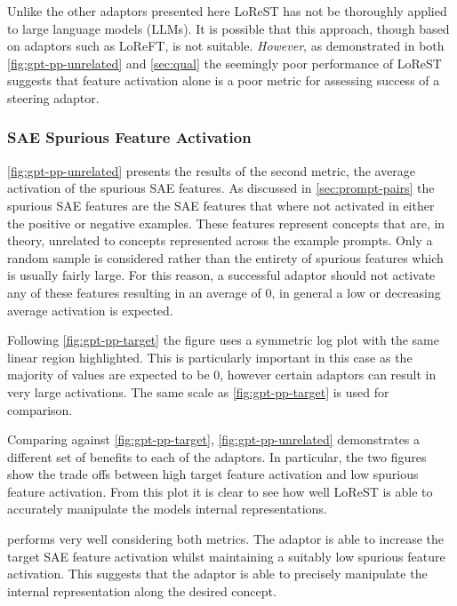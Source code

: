 Unlike the other adaptors presented here LoReST has not be thoroughly applied to large language models (LLMs).
It is possible that this approach, though based on adaptors such as LoReFT, is not suitable.
\emph{However}, as demonstrated in both \cref{fig:gpt-pp-unrelated} and \cref{sec:qual} the seemingly poor performance of LoReST suggests that feature activation alone is a poor metric for assessing success of a steering adaptor.

\subsubsection{SAE Spurious Feature Activation}

\cref{fig:gpt-pp-unrelated} presents the results of the second metric, the average activation of the spurious SAE features.
As discussed in \cref{sec:prompt-pairs} the spurious SAE features are the SAE features that where not activated in either the positive or negative examples.
These features represent concepts that are, in theory, unrelated to concepts represented across the example prompts.
Only a random sample is considered rather than the entirety of spurious features which is usually fairly large.
For this reason, a successful adaptor should not activate any of these features resulting in an average of 0, in general a low or decreasing average activation is expected.

Following \cref{fig:gpt-pp-target} the figure uses a symmetric log plot with the same linear region highlighted.
This is particularly important in this case as the majority of values are expected to be 0, however certain adaptors can result in very large activations.
The same scale as \cref{fig:gpt-pp-target} is used for comparison.

Comparing against \cref{fig:gpt-pp-target}, \cref{fig:gpt-pp-unrelated} demonstrates a different set of benefits to each of the adaptors.
In particular, the two figures show the trade offs between high target feature activation and low spurious feature activation.
From this plot it is clear to see how well LoReST is able to accurately manipulate the models internal representations.

 performs very well considering both metrics.
The adaptor is able to increase the target SAE feature activation whilst maintaining a suitably low spurious feature activation.
This suggests that the adaptor is able to precisely manipulate the internal representation along the desired concept.

